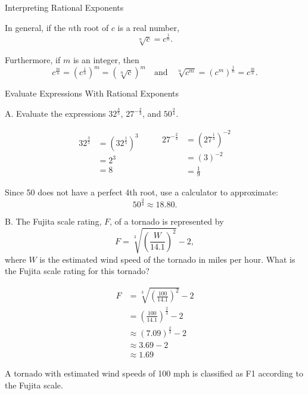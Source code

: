 \documentclass{article}
\newenvironment{concept-box}{}{}        %
\newenvironment{example}[1]{}{}         %
\newcommand{\answer}[1]{}               %
\newcommand{\placeholder}[2]{}          %
\begin{document}
\begin{concept-box}
Interpreting Rational Exponents

In general, if the \(n\)th root of \(c\) is a real number,
\[
\sqrt[n]{c}=c^{\frac1n}.
\]

Furthermore, if \(m\) is an integer, then
\[
c^{\frac mn}=\left(c^{\frac1n}\right)^m=\left(\sqrt[n]{c}\right)^m
\quad\text{and}\quad
\sqrt[n]{c^m}=\left(c^m\right)^{\frac1n}=c^{\frac mn}.
\]
\end{concept-box}

\begin{example}{3}
Evaluate Expressions With Rational Exponents

A. Evaluate the expressions \(32^{\frac35}\), \(27^{-\frac23}\), and \(50^{\frac34}\).

\[
\begin{aligned}
32^{\frac35}&=\left(32^{\frac15}\right)^3\\
&=2^3\\
&=8
\end{aligned}
\qquad
\begin{aligned}
27^{-\frac23}&=\left(27^{\frac13}\right)^{-2}\\
&=(3)^{-2}\\
&=\frac19
\end{aligned}
\]

Since 50 does not have a perfect 4th root, use a calculator to approximate:
\[
50^{\frac34}\approx 18.80.
\]

B. The Fujita scale rating, \(F\), of a tornado is represented by
\[
F=\sqrt[3]{\left(\frac{W}{14.1}\right)^2}-2,
\]
where \(W\) is the estimated wind speed of the tornado in miles per hour. What is the Fujita scale rating for this tornado?

\placeholder{photo}{Tornado over a road with a label pointing to the funnel cloud: "Wind speed estimated at 100 mph"}

\[
\begin{aligned}
F&=\sqrt[3]{\left(\frac{100}{14.1}\right)^2}-2\\
&=\left(\frac{100}{14.1}\right)^{\frac23}-2\\
&\approx (7.09)^{\frac23}-2\\
&\approx 3.69-2\\
&\approx 1.69
\end{aligned}
\]

A tornado with estimated wind speeds of 100 mph is classified as F1 according to the Fujita scale.

\answer{A. \(8\), \(\frac19\), and approximately \(18.80\). B. F1.}
\end{example}
\end{document}
